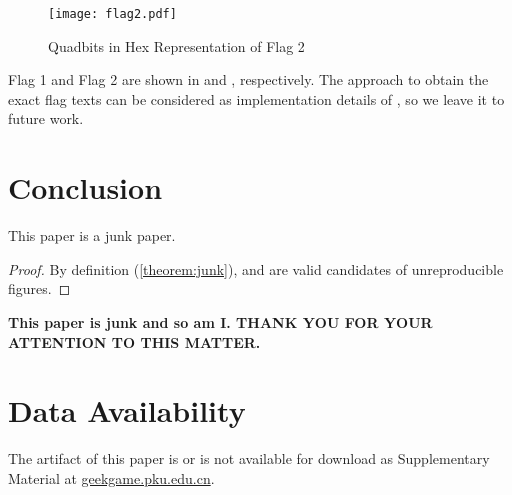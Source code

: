 \documentclass[sigconf,review,anonymous,screen]{acmart}
\begin{document}
\begin{figure}
    \centering
    \texttt{[image: flag2.pdf]}
    \vspace{-1.5em}
    \caption{Quadbits in Hex Representation of Flag 2}
    \label{fig:flag-2}
\end{figure}

Flag 1 and Flag 2 are shown in  and , respectively. The approach to obtain the exact flag texts can be considered as implementation details of \mmp, so we leave it to future work.

\section{Conclusion}

\begin{theorem}
This paper is a junk paper.
\end{theorem}

\begin{proof}
By definition (\ref{theorem:junk}),  and  are valid candidates of unreproducible figures.
\end{proof}


\begin{rqbox}
\textbf{This paper is junk and so am I. THANK YOU FOR YOUR ATTENTION TO THIS MATTER.}
\end{rqbox}

\section*{Data Availability}

The artifact of this paper is {\tiny or is not} available for download as Supplementary Material at \href{https://geekgame.pku.edu.cn}{geekgame.pku.edu.cn}.



\end{document}
